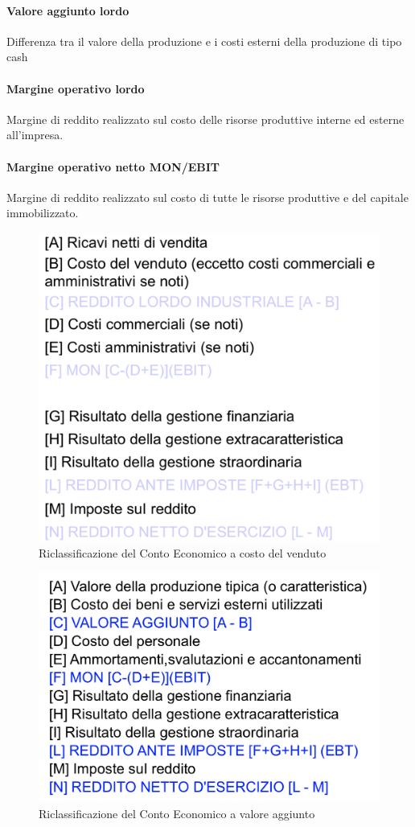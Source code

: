 \documentclass{report}
\begin{document}
	\paragraph{Valore aggiunto lordo} Differenza tra il valore della produzione e i costi esterni della produzione di tipo cash
	\paragraph{Margine operativo lordo} Margine di reddito realizzato sul costo delle risorse produttive interne ed esterne all'impresa.
	\paragraph{Margine operativo netto MON/EBIT} Margine di reddito realizzato sul costo di tutte le risorse produttive e del capitale immobilizzato.
	\begin{figure}[H]
		\centering
		\includegraphics[width=0.7\linewidth]{ce-costo-venduto}
		\caption{Riclassificazione del Conto Economico a costo del venduto}
		\label{fig:ce-costo-venduto}
	\end{figure}
	\begin{figure}[H]
		\centering
		\includegraphics[width=0.7\linewidth]{ce-valore-aggiunto}
		\caption{Riclassificazione del Conto Economico a valore aggiunto}
		\label{fig:ce-valore-aggiunto}
	\end{figure}
\end{document}
